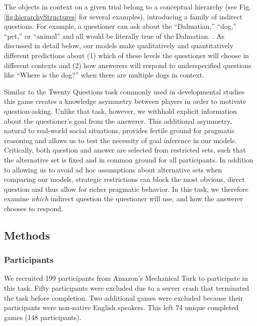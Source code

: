 \documentclass[12pt, floatsintext, jou]{apa6}
\begin{document}
The objects in context on a given trial belong to a conceptual hierarchy (see Fig. \ref{fig:hierarchyStructures} for several examples), introducing a family of indirect questions. For example, a questioner can ask about the ``Dalmatian,'' ``dog,'' ``pet,'' or ``animal'' and all would be literally true of the Dalmatian. \cite{Brown58_HowShallAThingBeCalled,GrafEtAl16_BasicLevel}. As discussed in detail below, our models make qualitatively and quantitatively different predictions about (1) which of these levels the questioner will choose in different contexts and (2) how answerers will respond to underspecified questions like ``Where is the dog?'' when there are multiple dogs in context.

Similar to the Twenty Questions task commonly used in developmental studies \cite{Siegler77_TwentyQuestions, NelsonDivjak___Meder14_GuessWho, RuggeriEtAl15_HierarchicalTwentyQs} this game creates a knowledge asymmetry between players in order to motivate question-asking. Unlike that task, however, we withhold explicit information about the questioner's goal from the answerer. This additional asymmetry, natural to real-world social situations, provides fertile ground for pragmatic reasoning and allows us to test the necessity of goal inference in our models. Critically, both question and answer are selected from restricted sets, such that the alternative set is fixed and in common ground for all participants. In addition to allowing us to avoid ad hoc assumptions about alternative sets when comparing our models, strategic restrictions can block the most obvious, direct question and thus allow for richer pragmatic behavior. In this task, we therefore examine \emph{which} indirect question the questioner will use, and how the answerer chooses to respond. 

\subsection{Methods}
\subsubsection{Participants} We recruited 199 participants from Amazon's Mechanical Turk to participate in this task. Fifty participants were excluded due to a server crash that terminated the task before completion. Two additional games were excluded because their participants were non-native English speakers. This left 74 unique completed games (148 participants).
\end{document}
